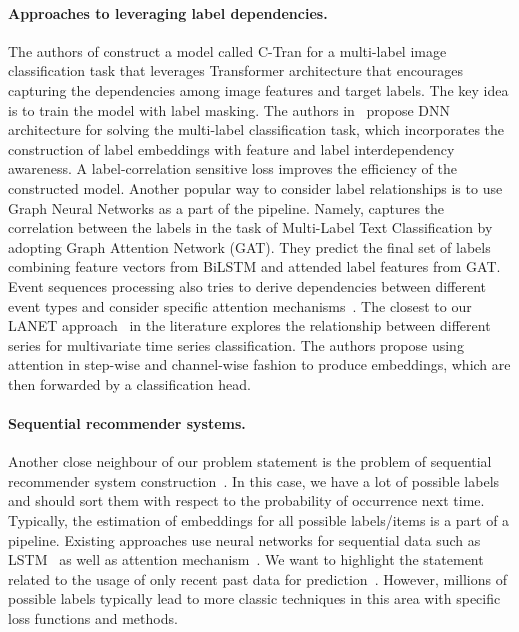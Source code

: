 \documentclass[runningheads]{llncs}
\begin{document}
\paragraph{\textbf{Approaches to leveraging label dependencies.}}
The authors of \cite{Lanchantin_2021_CVPR} construct a model called C-Tran for a multi-label image classification task that leverages Transformer architecture that encourages capturing the dependencies among image features and target labels. The key idea is to train the model with label masking. The authors in~\cite{yeh2017learning} propose DNN architecture for solving the multi-label classification task, which incorporates the construction of label embeddings with feature and label interdependency awareness. A label-correlation sensitive loss improves the efficiency of the constructed model. Another popular way to consider label relationships is to use Graph Neural Networks as a part of the pipeline. Namely, \cite{pal2020multi} captures the correlation between the labels in the task of Multi-Label Text Classification by adopting Graph Attention Network (GAT). They predict the final set of labels combining feature vectors from BiLSTM and attended label features from GAT.  
Event sequences processing also tries to derive dependencies between different event types and consider specific attention mechanisms~\cite{mei2021transformer}.
The closest to our LANET approach~\cite{liu2021gated} in the literature explores the relationship between different series for multivariate time series classification. The authors propose using attention in step-wise and channel-wise fashion to produce embeddings, which are then forwarded by a classification head. 

\paragraph{\textbf{Sequential recommender systems.}}
Another close neighbour of our problem statement is the problem of sequential recommender system construction~\cite{wang2019sequential,quadrana2018sequence}.
In this case, we have a lot of possible labels and should sort them with respect to the probability of occurrence next time.
Typically, the estimation of embeddings for all possible labels/items is a part of a pipeline.
Existing approaches use neural networks for sequential data such as LSTM~\cite{wu2017recurrent} as well as attention mechanism~\cite{wang2017perceiving}.
We want to highlight the statement related to the usage of only recent past data for prediction~\cite{li2020time}.
However, millions of possible labels typically lead to more classic techniques in this area with specific loss functions and methods.
\end{document}
